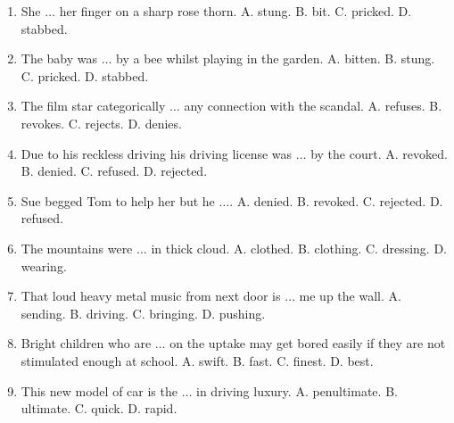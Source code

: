 \documentclass{article}
\numberwithin{equation}{section}
\begin{document}
\begin{enumerate}[leftmargin=2mm]
	\item She $\ldots$ her finger on a sharp rose thorn. {\sf A.} stung. {\sf B.} bit. {\sf C.} pricked. {\sf D.} stabbed.
	\item The baby was $\ldots$ by a bee whilst playing in the garden. {\sf A.} bitten. {\sf B.} stung. {\sf C.} pricked. {\sf D.} stabbed.
	\item The film star categorically $\ldots$ any connection with the scandal. {\sf A.} refuses. {\sf B.} revokes. {\sf C.} rejects. {\sf D.} denies.
	\item Due to his reckless driving his driving license was $\ldots$ by the court. {\sf A.} revoked. {\sf B.} denied. {\sf C.} refused. {\sf D.} rejected.
	\item Sue begged Tom to help her but he $\ldots$. {\sf A.} denied. {\sf B.} revoked. {\sf C.} rejected. {\sf D.} refused.
	\item The mountains were $\ldots$ in thick cloud. {\sf A.} clothed. {\sf B.} clothing. {\sf C.} dressing. {\sf D.} wearing.
	\item That loud heavy metal music from next door is $\ldots$ me up the wall. {\sf A.} sending. {\sf B.} driving. {\sf C.} bringing. {\sf D.} pushing.
	\item Bright children who are $\ldots$ on the uptake may get bored easily if they are not stimulated enough at school. {\sf A.} swift. {\sf B.} fast. {\sf C.} finest. {\sf D.} best.
	\item This new model of car is the $\ldots$ in driving luxury. {\sf A.} penultimate. {\sf B.} ultimate. {\sf C.} quick. {\sf D.} rapid.
\end{enumerate}


\printbibliography[heading=bibintoc]
	
\end{document}
